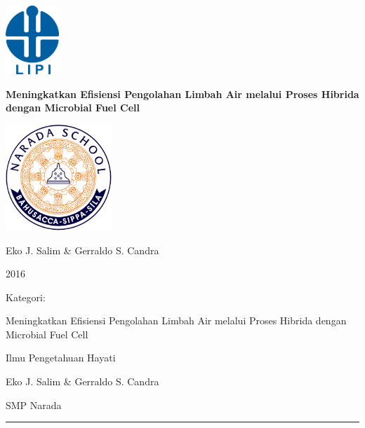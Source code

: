 \documentclass[12pt,a4paper]{report}
\begin{document}
\begin{titlepage}


	\vspace{1cm}	
	\centering
	\includegraphics[width=0.15\textwidth]{gfx/lipi}\par\vspace{1cm}
	{\huge\bfseries Meningkatkan Efisiensi Pengolahan Limbah Air melalui Proses Hibrida dengan Microbial Fuel Cell\par}
	\vspace{1cm}
	\includegraphics[width=0.3\textwidth]{gfx/narada}\par\vspace{1cm}
	\vspace{1cm}
	{\Large Eko J. Salim \& Gerraldo S. Candra\par}
	\vfill

	{\large 2016\par}
\end{titlepage}
\newpage
\begin{labeling}{Kategori:}
\item [Judul:] Meningkatkan Efisiensi Pengolahan Limbah Air melalui Proses Hibrida dengan Microbial Fuel Cell
\item [Bidang:] Ilmu Pengetahuan Hayati
\item [Kategori:] 
\item [Nama:] Eko J. Salim \& Gerraldo S. Candra
\item [Sekolah:] SMP Narada
\end{labeling}
\rule{\textwidth}{0.4pt}
\end{document}
